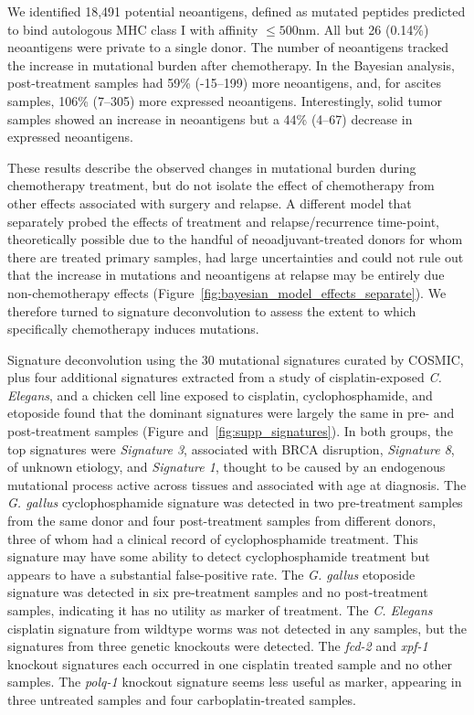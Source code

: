 We identified 18,491 potential neoantigens, defined as mutated peptides predicted to bind autologous MHC class I with affinity $\leq 500$nm. All but 26 (0.14\%) neoantigens were private to a single donor. The number of neoantigens tracked the increase in mutational burden after chemotherapy. In the Bayesian analysis, post-treatment samples had 59\% (-15--199) more neoantigens, and, for ascites samples, 106\% (7--305) more expressed neoantigens. Interestingly, solid tumor samples showed an increase in neoantigens but a 44\% (4--67) decrease in expressed neoantigens.

These results describe the observed changes in mutational burden during chemotherapy treatment, but do not isolate the effect of chemotherapy from other effects associated with surgery and relapse. A different model that separately probed the effects of treatment and relapse/recurrence time-point, theoretically possible due to the handful of neoadjuvant-treated donors for whom there are treated primary samples, had large uncertainties and could not rule out that the increase in mutations and neoantigens at relapse may be entirely due non-chemotherapy effects (Figure~\ref{fig:bayesian_model_effects_separate}). We therefore turned to signature deconvolution to assess the extent to which specifically chemotherapy induces mutations.

Signature deconvolution using the 30 mutational signatures curated by COSMIC\cite{364242}, plus four additional signatures extracted from a study of cisplatin-exposed \textit{C. Elegans}\cite{Meier_2014}, and a chicken cell line exposed to cisplatin, cyclophosphamide, and etoposide\cite{Szikriszt_2016} found that the dominant signatures were largely the same in pre- and post-treatment samples (Figure and~\ref{fig:supp_signatures}). In both groups, the top signatures were \textit{Signature 3}, associated with BRCA disruption, \textit{Signature 8}, of unknown etiology, and \textit{Signature 1}, thought to be caused by an endogenous mutational process active across tissues and associated with age at diagnosis. The \textit{G. gallus} cyclophosphamide signature was detected in two pre-treatment samples from the same donor and four post-treatment samples from different donors, three of whom had a clinical record of cyclophosphamide treatment. This signature may have some ability to detect cyclophosphamide treatment but appears to have a substantial false-positive rate. The \textit{G. gallus} etoposide signature was detected in six pre-treatment samples and no post-treatment samples, indicating it has no utility as marker of treatment. The \textit{C. Elegans} cisplatin signature from wildtype worms was not detected in any samples, but the signatures from three genetic knockouts were detected. The \textit{fcd-2} and \textit{xpf-1} knockout signatures each occurred in one cisplatin treated sample and no other samples. The \textit{polq-1} knockout signature seems less useful as marker, appearing in three untreated samples and four carboplatin-treated samples.

